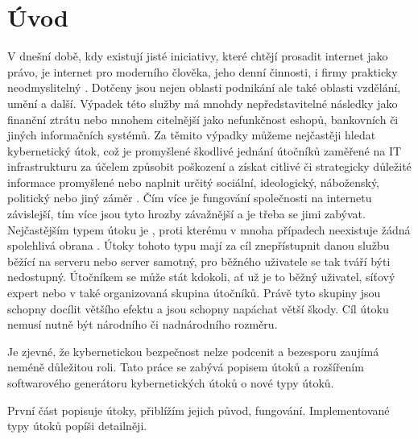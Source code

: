 \chapter*{Úvod}
{}


V dnešní době, kdy existují jisté iniciativy, které chtějí prosadit internet jako právo, je internet 
pro moderního člověka, jeho denní činnosti, i firmy prakticky neodmyslitelný \cite{pirati_internet}. 
Dotčeny jsou nejen oblasti podnikání ale také oblasti vzdělání, umění a další. Výpadek této služby má 
mnohdy nepředstavitelné následky jako finanční ztrátu nebo mnohem citelnější jako nefunkčnost eshopů, 
bankovních či jiných informačních systémů. Za těmito výpadky můžeme nejčastěji hledat kybernetický útok, 
což je promyšlené škodlivé jednání útočníků zaměřené na  IT  infrastrukturu  za  účelem  způsobit 
poškození  a  získat  citlivé  či  strategicky  důležité 
informace promyšlené nebo naplnit určitý sociální, ideologický, náboženský, politický nebo jiný záměr 
\cite{Jirasek2012}. Čím více je fungování společnosti na internetu závislejší, tím více jsou tyto hrozby 
závažnější a je třeba se jimi zabývat. Nejčastějším typem útoku je , proti kterému 
v mnoha případech neexistuje  žádná spolehlivá obrana \cite{akamai_q2_2017}. Útoky tohoto typu mají 
za cíl znepřístupnit danou službu běžící na serveru nebo server samotný, pro běžného uživatele se tak 
tváří býti nedostupný. Útočníkem se může stát kdokoli, ať už je to běžný uživatel, síťový expert nebo 
v také organizovaná skupina útočníků. Právě tyto skupiny jsou schopny docílit většího efektu a jsou 
schopny napáchat větší škody. Cíl útoku nemusí nutně být národního či nadnárodního rozměru.

Je zjevné, že kybernetickou bezpečnost nelze podcenit a bezesporu zaujímá neméně důležitou roli. Tato 
práce se zabývá popisem  útoků a rozšířením softwarového generátoru kybernetických útoků 
o nové typy útoků.

První část popisuje  útoky, přiblížím jejich původ, fungování. Implementované typy útoků 
popíši detailněji.